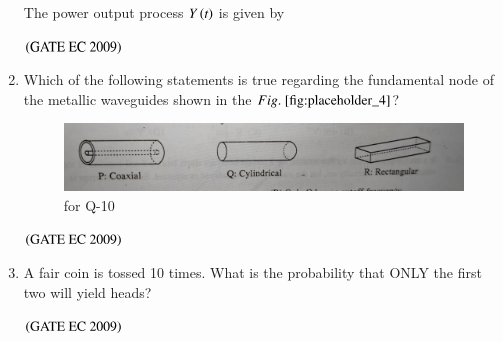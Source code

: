 \documentclass[journal,12pt,onecolumn]{IEEEtran}
\theoremstyle{remark}
\begin{document}
\begin{enumerate}[start=1, label={Q\arabic*.}]
The power output process $Y\left(t\right)$ is given by 

\begin{enumerate}
\end{enumerate}
\hfill $\left(\text{GATE EC 2009}\right)$

\item Which of the following statements is true regarding the fundamental node of the metallic waveguides shown in the $\figref{fig:placeholder_4}$?
\begin{figure}[H]
    \centering
    \includegraphics[width=0.5\columnwidth]{figs/img_4.jpg}
    \caption{for Q-10}
    \label{fig:placeholder_4}
\end{figure}
\begin{enumerate}
\end{enumerate}
\hfill $\left(\text{GATE EC 2009}\right)$

\item A fair coin is tossed 10 times. What is the probability that ONLY the first two will yield heads?

\begin{enumerate}
\end{enumerate}
\hfill $\left(\text{GATE EC 2009}\right)$


\end{enumerate}
\end{document}
